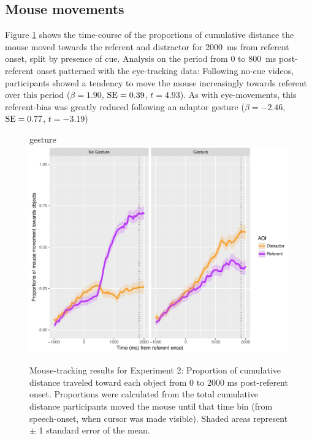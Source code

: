 \documentclass[a4paper,man,natbib]{apa6}
\newcommand{\resultsLM}[3]{$\beta = #1$, $\textnormal{SE} = #2$, $t #3$}
\begin{document}
\subsection{Mouse movements}
Figure \ref{fig:v2_mouse} shows the time-course of the proportions of cumulative distance the mouse moved towards the referent and distractor for 2000~ms from referent onset, split by presence of cue.
Analysis on the period from 0 to 800~ms post-referent onset patterned with the eye-tracking data:
Following no-cue videos, participants showed a tendency to move the mouse increasingly towards referent over this period (\resultsLM{1.90}{0.39}{=4.93}).
As with eye-movements, this referent-bias was greatly reduced following an adaptor gesture (\resultsLM{-2.46}{0.77}{=-3.19})

\begin{figure}[Ht]gesture
  \centering
	\includegraphics[width=\linewidth]{./img/e8_mouset.pdf}
  \caption{Mouse-tracking results for Experiment 2: Proportion of cumulative distance traveled toward each object from 0 to 2000 ms post-referent onset. Proportions were calculated from the total cumulative distance participants moved the mouse until that time bin (from speech-onset, when cursor was made visible). Shaded areas represent $\pm$ 1 standard error of the mean.}
  \label{fig:v2_mouse}
\end{figure}
\end{document}
